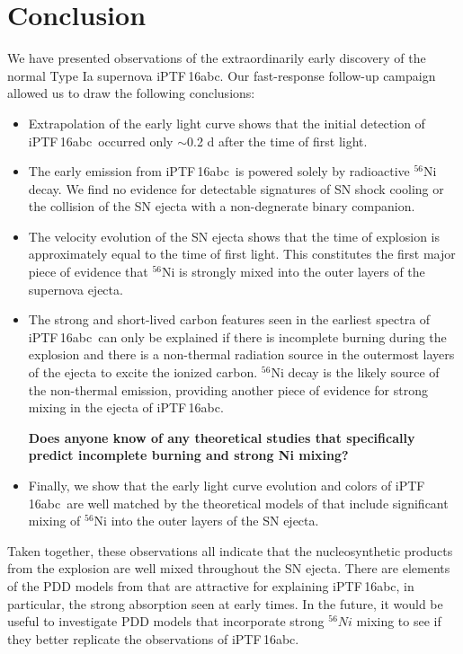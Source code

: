 \documentclass[twocolumn]{aastex61}
\newcommand{\abc}{iPTF\,16abc}
\begin{document}
\section{Conclusion}
\label{sec:conclusion}

We have presented observations of the extraordinarily early discovery of the 
normal Type Ia supernova \abc. Our fast-response follow-up 
campaign allowed us to draw the following conclusions:

\begin{itemize}
    \item Extrapolation of the early light curve shows that the initial detection of \abc\ occurred only $\sim$0.2 d after the time of first light.

    \item The early emission from \abc\ is powered solely by radioactive $^{56}$Ni decay. We find no evidence for detectable signatures of SN shock cooling or the collision of the SN ejecta with a non-degnerate binary companion.

\item The velocity evolution of the SN ejecta shows that the time of explosion is approximately equal to the time of first light. This constitutes the first major piece of evidence that $^{56}$Ni is strongly mixed into the outer layers of the supernova ejecta.

\item The strong and short-lived carbon features seen in the 
earliest spectra of \abc\ can only be explained if there is incomplete burning during the explosion and there is a non-thermal 
radiation source in the outermost layers of the ejecta to excite the ionized carbon. $^{56}$Ni decay is the likely source of the non-thermal emission, providing another piece of evidence for strong mixing in the ejecta of \abc. 

\textbf{Does anyone know of any theoretical studies that specifically predict incomplete burning and strong Ni mixing?}

\item Finally, we show that the early light curve evolution and colors of \abc\ are well matched by the theoretical models of \citet{2016ApJ...826...96P} that include significant mixing of $^{56}$Ni into the outer layers of the SN ejecta. 
 
\end{itemize}
%
Taken together, these observations all indicate that the nucleosynthetic products from the explosion are well mixed throughout the SN ejecta. There are elements of the PDD models from \citet{2014MNRAS.441..532D} that are attractive for explaining \abc, in particular, the strong  absorption seen at early times. In the future, it would be useful to investigate PDD models that incorporate strong $^{56}Ni$ mixing to see if they better replicate the observations of \abc.  
\end{document}
